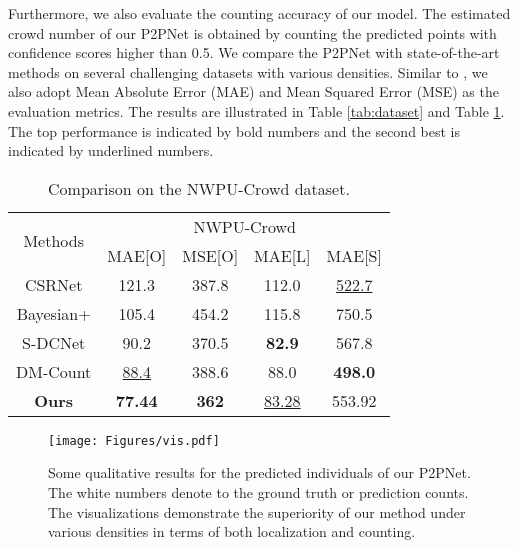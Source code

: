 \documentclass[10pt,twocolumn,letterpaper]{article}
\begin{document}
Furthermore, we also evaluate the counting accuracy of our model. The estimated crowd number of our P2PNet is obtained by counting the predicted points with confidence scores higher than 0.5. We compare the P2PNet with state-of-the-art methods on several challenging datasets with various densities. Similar to \cite{zhang2016single}, we also adopt Mean Absolute Error (MAE) and Mean Squared Error (MSE) as the evaluation metrics. The results are illustrated in Table \ref{tab:dataset} and Table \ref{tab:nwpu_data}. The top performance is indicated by bold numbers and the second best is indicated by underlined numbers.
\begin{table}[ht!]
\centering
\small{
\begin{tabular}{c|cccc}
\toprule[1pt]
\multirow{2}{*}{Methods}&\multicolumn{4}{c}{NWPU-Crowd}\\ \cline{2-5}
& MAE[O]&MSE[O]&MAE[L]&MAE[S] \\ \hline
CSRNet \cite{li2018csrnet} & 121.3 & 387.8 & 112.0 & \underline{522.7} \\
Bayesian+ \cite{ma2019bayesian} & 105.4 & 454.2 & 115.8 & 750.5 \\
S-DCNet \cite{xiong2019open}  & 90.2 & 370.5 & \textbf{82.9} & 567.8 \\
DM-Count \cite{wang2020distribution} & \underline{88.4} & 388.6 & 88.0 & \textbf{498.0} \\
\textbf{Ours} & \textbf{77.44}&\textbf{362} & \underline{83.28}& 553.92 \\
\bottomrule[1pt]
\end{tabular}}
\vspace{-0.5em}
\caption{Comparison on the NWPU-Crowd dataset.}\label{tab:nwpu_data}
\vspace{-1.5em}
\end{table}
\begin{figure*}[t!] 
\vspace{-1.0em}
  \centering
  \texttt{[image: Figures/vis.pdf]}
  \caption{Some qualitative results for the predicted individuals of our P2PNet. The white numbers denote to the ground truth or prediction counts. The visualizations demonstrate the superiority of our method under various densities in terms of both localization and counting.}
  \label{fig6} 
  \vspace{-1.5em}
\end{figure*}
\end{document}
